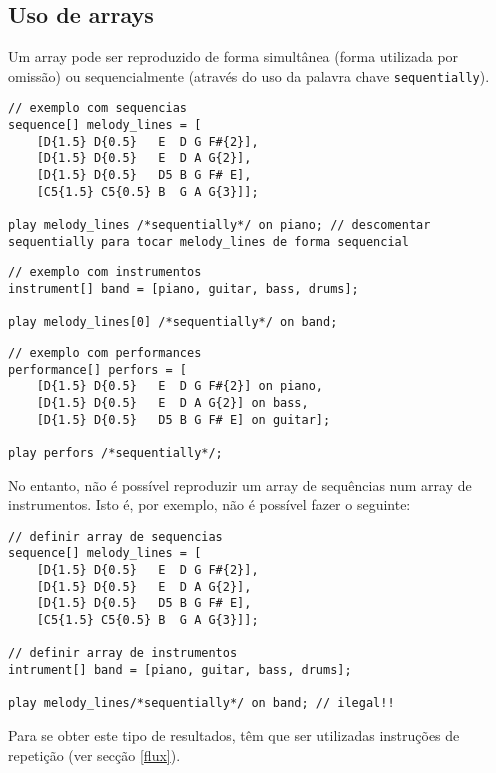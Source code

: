 \documentclass{article}
\begin{document}
\subsection{Uso de arrays}
Um array pode ser reproduzido de forma simultânea (forma utilizada por omissão) ou sequencialmente (através do uso da palavra chave \texttt{sequentially}).

\begin{lstlisting} 
// exemplo com sequencias
sequence[] melody_lines = [
    [D{1.5} D{0.5}   E  D G F#{2}], 
    [D{1.5} D{0.5}   E  D A G{2}],
    [D{1.5} D{0.5}   D5 B G F# E],
    [C5{1.5} C5{0.5} B  G A G{3}]];

play melody_lines /*sequentially*/ on piano; // descomentar sequentially para tocar melody_lines de forma sequencial
\end{lstlisting}

\begin{lstlisting} 
// exemplo com instrumentos
instrument[] band = [piano, guitar, bass, drums];

play melody_lines[0] /*sequentially*/ on band;
\end{lstlisting}

\begin{lstlisting} 
// exemplo com performances
performance[] perfors = [
    [D{1.5} D{0.5}   E  D G F#{2}] on piano, 
    [D{1.5} D{0.5}   E  D A G{2}] on bass,
    [D{1.5} D{0.5}   D5 B G F# E] on guitar];
    
play perfors /*sequentially*/;
\end{lstlisting}
No entanto, não é possível reproduzir um array de sequências num array de instrumentos. Isto é, por exemplo, não é possível fazer o seguinte:

\begin{lstlisting} 
// definir array de sequencias
sequence[] melody_lines = [
    [D{1.5} D{0.5}   E  D G F#{2}], 
    [D{1.5} D{0.5}   E  D A G{2}],
    [D{1.5} D{0.5}   D5 B G F# E],
    [C5{1.5} C5{0.5} B  G A G{3}]];

// definir array de instrumentos
intrument[] band = [piano, guitar, bass, drums];

play melody_lines/*sequentially*/ on band; // ilegal!!
\end{lstlisting}

Para se obter este tipo de resultados, têm que ser utilizadas instruções de repetição (ver secção \ref{flux}).

\end{document}
